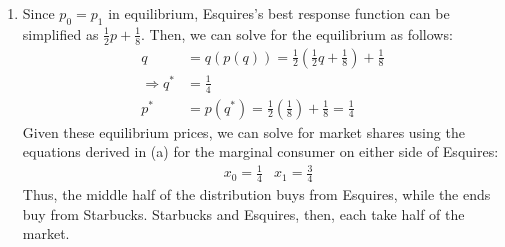 \documentclass{article}
\begin{document}
\begin{enumerate}
\begin{enumerate}
    \item Since $p_0=p_1$ in equilibrium, Esquires's best response function can be simplified as ${\frac{1}{2}p + \frac{1}{8}}$. Then, we can solve for the equilibrium as follows: 
    \begin{align*}
      q   &= q(p(q)) = \frac{1}{2}\left(\frac{1}{2}q + \frac{1}{8}\right) + \frac{1}{8}  \\
      \Rightarrow q^* &= \frac{1}{4}  \\
      p^* &= p(q^*) = \frac{1}{2}\left(\frac{1}{8}\right) + \frac{1}{8} = \frac{1}{4}
    \end{align*}
    Given these equilibrium prices, we can solve for market shares using the equations derived in (a) for the marginal consumer on either side of Esquires:
    \begin{align*}
      &x_0 = \frac{1}{4}  &x_1 = \frac{3}{4}
    \end{align*}
    Thus, the middle half of the distribution buys from Esquires, while the ends buy from Starbucks. Starbucks and Esquires, then, each take half of the market.
    

\end{enumerate}
\end{enumerate}
\end{document}
